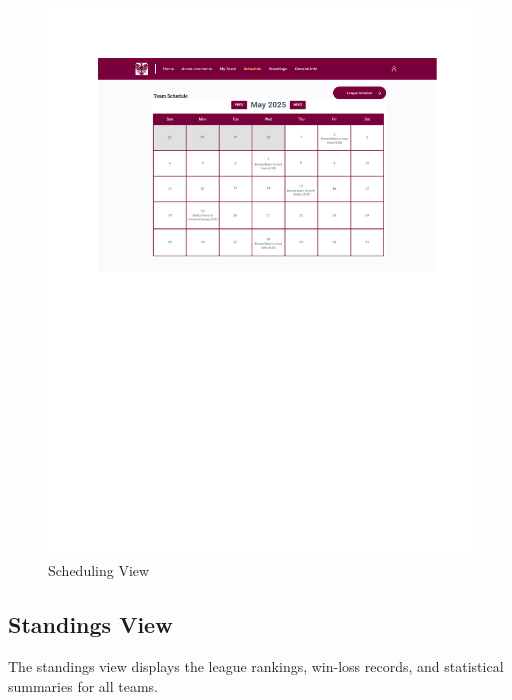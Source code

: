 \documentclass[12pt, titlepage]{article}
\begin{document}
\begin{figure}[H]
  \centering
  \includegraphics[scale=0.7]{TeamScheduleView.pdf}
  \caption{Scheduling View}
  \label{fig:scheduling_view}
\end{figure}

\newpage

\subsection{Standings View}
The standings view displays the league rankings, win-loss records, and statistical summaries for all teams.
\end{document}
